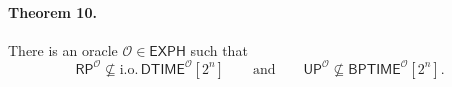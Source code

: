 \paragraph{Theorem 10.} There is an oracle $\mathcal O\in\mathsf{EXPH}$ such that
\[\mathsf{RP}^{\mathcal O}\not\subseteq\mathrm{i.o.}\,\mathsf{DTIME}^{\mathcal O}[2^n]\qquad\text{and}\qquad\mathsf{UP}^{\mathcal O}\not\subseteq\mathsf{BPTIME}^{\mathcal O}[2^n].\]
